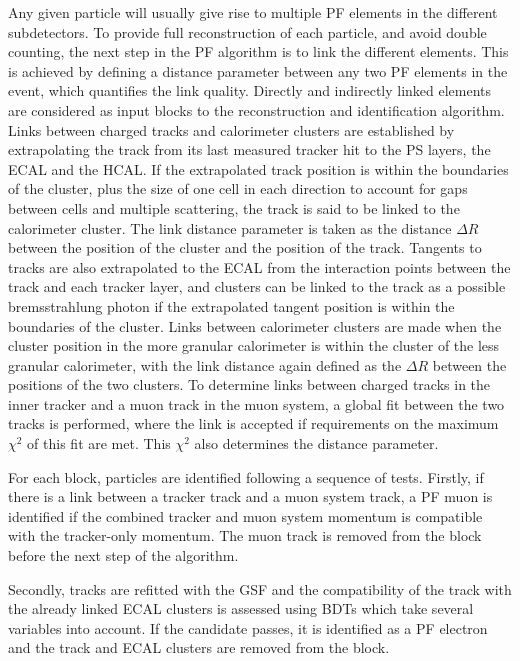 Any given particle will usually give rise to multiple \ac{PF}
elements in the different subdetectors. To provide full reconstruction
of each particle, and avoid double counting, the next step in the
\ac{PF} algorithm is to link the different elements. This is
achieved by defining a distance parameter between any two \ac{PF} elements
in the event, which quantifies the link quality. Directly and indirectly
linked elements are considered as input blocks to the reconstruction and
identification algorithm. Links between charged tracks and calorimeter
clusters are established by extrapolating the track from its last measured
tracker hit to the \ac{PS} layers, the \ac{ECAL} and the \ac{HCAL}. %
If the extrapolated track position is within the boundaries of the cluster, plus the size
of one cell in each direction to account for gaps between cells and multiple scattering, the
track is said to be linked to the calorimeter cluster. The link distance parameter 
is taken as the distance $\Delta R$ 
between the position of the cluster and the position of the track. Tangents to tracks are also extrapolated
to the ECAL from the interaction points between the track and each tracker layer, and clusters can be 
linked to the track as a possible bremsstrahlung photon if the extrapolated tangent
position is within the boundaries of the cluster.
Links between calorimeter clusters are made when the cluster position in the
more granular calorimeter is within the cluster of the less granular calorimeter,
with the link distance again defined as the $\Delta R$ between the positions of the two clusters.
To determine links between charged tracks in the inner tracker and a muon track
in the muon system, a global fit between the two tracks is performed, where the link
is accepted if requirements on the maximum $\chi^2$ of this fit are met. This
$\chi^2$ also determines the distance parameter.

For each block, particles are identified following a sequence
of tests. Firstly, if there is a link between a tracker track and a muon system track,
a \ac{PF} muon is identified if the combined tracker and muon system
momentum is compatible with the tracker-only momentum. %
The muon track is removed from the block before the next step of the algorithm.

Secondly, tracks are refitted with the \ac{GSF} and the compatibility
of the track with the already linked \ac{ECAL} clusters is assessed using
\acp{BDT} which take several variables into account. If the candidate
passes, it is identified as a \ac{PF} electron and the track and
\ac{ECAL} clusters are removed from the block.

